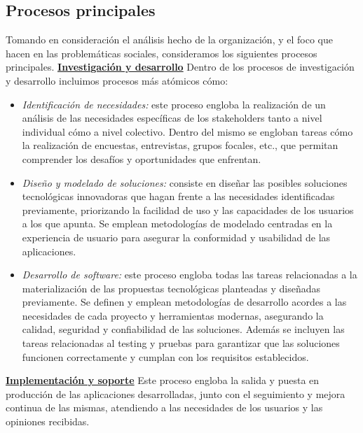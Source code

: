\documentclass[a4paper,12pt]{article}
\begin{document}
    \subsection{Procesos principales}
    Tomando en consideración el análisis hecho de la organización, y el foco que hacen en las problemáticas sociales, consideramos los siguientes procesos principales.\newline
    \newline
    \textbf{\underline{Investigación y desarrollo}}\newline
    Dentro de los procesos de investigación y desarrollo incluimos procesos más atómicos cómo:
    \begin{itemize}
        \item[] \textit{Identificación de necesidades:} este proceso engloba la realización de un análisis de las necesidades específicas de los stakeholders tanto a nivel individual cómo a nivel colectivo. Dentro del mismo se engloban tareas cómo la realización de encuestas, entrevistas, grupos focales, etc., que permitan comprender los desafíos y oportunidades que enfrentan.
        \item[] \textit{Diseño y modelado de soluciones:} consiste en diseñar las posibles soluciones tecnológicas innovadoras que hagan frente a las necesidades identificadas previamente, priorizando la facilidad de uso y las capacidades de los usuarios a los que apunta. Se emplean metodologías de modelado centradas en la experiencia de usuario para asegurar la conformidad y usabilidad de las aplicaciones.
        \item[] \textit{Desarrollo de software:} este proceso engloba todas las tareas relacionadas a la materialización de las propuestas tecnológicas planteadas y diseñadas previamente. Se definen y emplean metodologías de desarrollo acordes a las necesidades de cada proyecto y herramientas modernas, asegurando la calidad, seguridad y confiabilidad de las soluciones. Además se incluyen las tareas relacionadas al testing y pruebas para garantizar que las soluciones funcionen correctamente y cumplan con los requisitos establecidos.
    \end{itemize}
    \textbf{\underline{Implementación y soporte}}
    \newline
    Este proceso engloba la salida y puesta en producción de las aplicaciones desarrolladas, junto con el seguimiento y mejora continua de las mismas, atendiendo a las necesidades de los usuarios y las opiniones recibidas.
\end{document}

